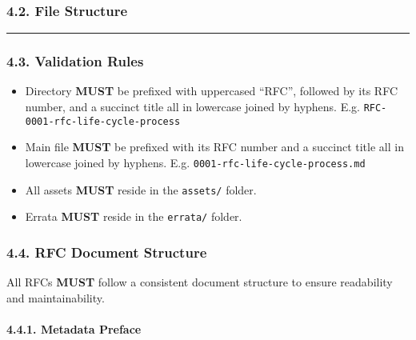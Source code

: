 \subsubsection{4.2. File Structure}\label{file-structure}

\begin{Shaded}
\begin{Highlighting}[]
\end{Highlighting}
\end{Shaded}

\begin{center}\rule{0.5\linewidth}{0.5pt}\end{center}

\subsubsection{4.3. Validation Rules}\label{validation-rules}

\begin{itemize}
\tightlist
\item
  Directory \textbf{MUST} be prefixed with uppercased ``RFC'', followed
  by its RFC number, and a succinct title all in lowercase joined by
  hyphens. E.g. \texttt{RFC-0001-rfc-life-cycle-process}
\item
  Main file \textbf{MUST} be prefixed with its RFC number and a succinct
  title all in lowercase joined by hyphens. E.g.
  \texttt{0001-rfc-life-cycle-process.md}
\item
  All assets \textbf{MUST} reside in the \texttt{assets/} folder.
\item
  Errata \textbf{MUST} reside in the \texttt{errata/} folder.
\end{itemize}

\subsubsection{4.4. RFC Document
Structure}\label{rfc-document-structure}

All RFCs \textbf{MUST} follow a consistent document structure to ensure
readability and maintainability.

\paragraph{4.4.1. Metadata Preface}\label{metadata-preface}

